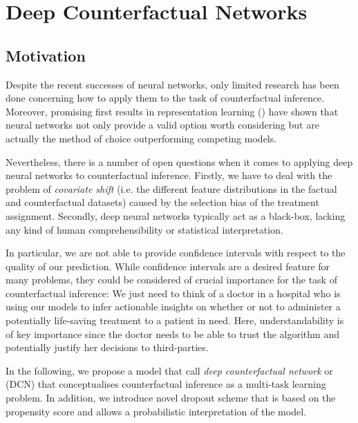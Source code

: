 %

\chapter{\label{ch:3-DCNs}Deep Counterfactual Networks} 


\section{Motivation}
Despite the recent successes of neural networks, only limited research has been done concerning how to apply them to the task of counterfactual inference. Moreover, promising first results in representation learning (\cite{sontag-paper}) have shown that neural networks not only provide a valid option worth considering but are actually the method of choice outperforming competing models. 

Nevertheless, there is a number of open questions when it comes to applying deep neural networks to counterfactual inference. Firstly, we have to deal with the problem of \emph{covariate shift} (i.e. the different feature distributions in the factual and counterfactual datasets) caused by the selection bias of the treatment assignment. Secondly, deep neural networks typically act as a black-box, lacking any kind of human comprehensibility or statistical interpretation.
 
In particular, we are not able to provide confidence intervals with respect to the quality of our prediction. While confidence intervals are a desired feature for many problems, they could be considered of crucial importance for the task of counterfactual inference: We just need to think of a doctor in a hospital who is using our models to infer actionable insights on whether or not to administer a potentially life-saving treatment to a patient in need. Here, understandability is of key importance since the doctor needs to be able to trust the algorithm and potentially justify her decisions to third-parties. 

In the following, we propose a model that call \emph{deep counterfactual network} or (DCN) that conceptualises counterfactual inference as a multi-task learning problem. In addition, we introduce novel dropout scheme that is based on the propensity score and allows a probabilistic interpretation of the model.
 
